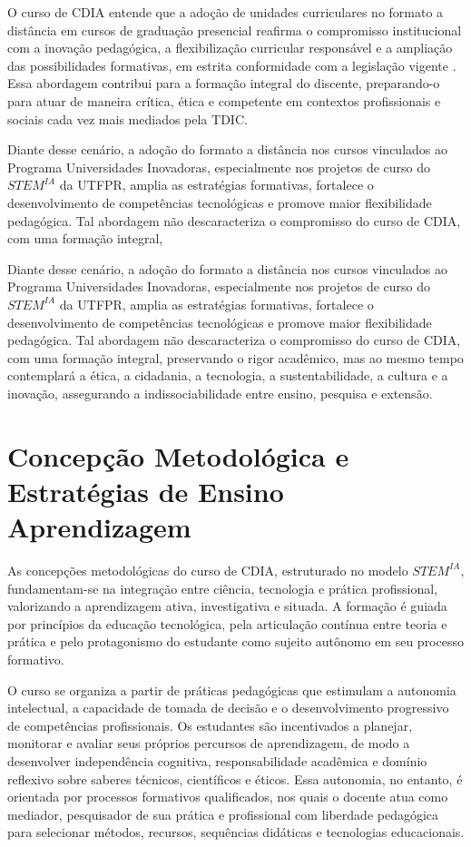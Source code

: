 O curso de CDIA entende que a adoção de unidades curriculares no formato a distância em cursos de graduação presencial reafirma o compromisso institucional com a inovação pedagógica, a flexibilização curricular responsável e a ampliação das possibilidades formativas, em estrita conformidade com a legislação vigente \cite{UTFPR_EAD_2022, Analise_DNC_2021}. Essa abordagem contribui para a formação integral do discente, preparando-o para atuar de maneira crítica, ética e competente em contextos profissionais e sociais cada vez mais mediados pela TDIC.

Diante desse cenário, a adoção do formato a distância nos cursos vinculados ao Programa Universidades Inovadoras, especialmente nos projetos de curso do $STEM^{IA}$ da UTFPR, amplia as estratégias formativas, fortalece o desenvolvimento de competências tecnológicas e promove maior flexibilidade pedagógica. Tal abordagem não descaracteriza o compromisso do curso de CDIA, com uma formação integral,

Diante desse cenário, a adoção do formato a distância nos cursos vinculados ao Programa Universidades Inovadoras, especialmente nos projetos de curso do $STEM^{IA}$ da UTFPR, amplia as estratégias formativas, fortalece o desenvolvimento de competências tecnológicas e promove maior flexibilidade pedagógica. Tal abordagem não descaracteriza o compromisso do curso de CDIA, com uma formação integral, preservando o rigor acadêmico, mas ao mesmo tempo contemplará a ética, a cidadania, a tecnologia, a sustentabilidade, a cultura e a inovação, assegurando a indissociabilidade entre ensino, pesquisa e extensão.

\section{Concepção Metodológica e Estratégias de Ensino Aprendizagem}
\label{sec:metodologia}

As concepções metodológicas do curso de CDIA, estruturado no modelo $STEM^{IA}$, fundamentam-se na integração entre ciência, tecnologia e prática profissional, valorizando a aprendizagem ativa, investigativa e situada. A formação é guiada por princípios da educação tecnológica, pela articulação contínua entre teoria e prática e pelo protagonismo do estudante como sujeito autônomo em seu processo formativo.

O curso se organiza a partir de práticas pedagógicas que estimulam a autonomia intelectual, a capacidade de tomada de decisão e o desenvolvimento progressivo de competências profissionais. Os estudantes são incentivados a planejar, monitorar e avaliar seus próprios percursos de aprendizagem, de modo a desenvolver independência cognitiva, responsabilidade acadêmica e domínio reflexivo sobre saberes técnicos, científicos e éticos. Essa autonomia, no entanto, é orientada por processos formativos qualificados, nos quais o docente atua como mediador, pesquisador de sua prática e profissional com liberdade pedagógica para selecionar métodos, recursos, sequências didáticas e tecnologias educacionais.

